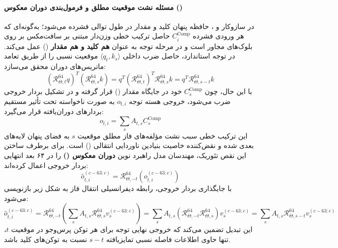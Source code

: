 \paragraph*{مسئله نشت موقعیت مطلق و فرمول‌بندی دوران معکوس ()}
در سازوکار  و ، حافظه پنهان کلید و مقدار در طول توالی فشرده می‌شود؛ به‌گونه‌ای که هر ورودی فشرده $C_i^{\text{Comp}}$ حاصل ترکیب خطی وزن‌دار مبتنی بر سافت‌مکس بر روی بلوک‌های مجاور است و در مرحله توجه به عنوان \textbf{هم کلید و هم مقدار} () عمل می‌کند. در توجه استاندارد، حاصل ضرب داخلی $\langle q_t, k_s \rangle$ موقعیت نسبی را از طریق تعامد ماتریس‌های دوران محقق می‌سازد:
\begin{equation}
    (\mathcal{R}_{\Theta, t}^{64} q)^T (\mathcal{R}_{\Theta, s}^{64} k) = q^T (\mathcal{R}_{\Theta, t}^{64})^T \mathcal{R}_{\Theta, s}^{64} k = q^T \mathcal{R}_{\Theta, s-t}^{64} k
\end{equation}
با این حال، چون $C_s^{\text{Comp}}$ خود در جایگاه مقدار () قرار گرفته و در تشکیل بردار خروجی ضرب می‌شود، خروجی هسته توجه $o_{t, i}$ به صورت ناخواسته تحت تأثیر مستقیم بردارهای دوران‌یافته قرار می‌گیرد:
\begin{equation}
    o_{t, i} = \sum_{s} A_{t, s} C_s^{\text{Comp}}
\end{equation}
این ترکیب خطی سبب نشت مؤلفه‌های فاز مطلق موقعیت $s$ به فضای پنهان لایه‌های بعدی شده و نقض‌کننده خاصیت بنیادین ناوردایی انتقالی () است. برای برطرف ساختن این نقص تئوریک، مهندسان مدل راهبرد نوین \textbf{دوران معکوس ()} را در ۶۴ بعد انتهایی بردار خروجی اعمال کرده‌اند:
\begin{equation}
    \hat{o}_{t, i}^{(c-63:c)} = \mathcal{R}_{\Theta, -t}^{64} \left( o_{t, i}^{(c-63:c)} \right)
\end{equation}
با جایگذاری بردار خروجی، رابطه دیفرانسیلی انتقال فاز به شکل زیر بازنویسی می‌شود:
\begin{equation}
    \hat{o}_{t, i}^{(c-63:c)} = \mathcal{R}_{\Theta, -t}^{64} \left( \sum_s A_{t, s} \mathcal{R}_{\Theta, s}^{64} v_s^{(c-63:c)} \right) = \sum_s A_{t, s} \left( \mathcal{R}_{\Theta, -t}^{64} \mathcal{R}_{\Theta, s}^{64} \right) v_s^{(c-63:c)} = \sum_s A_{t, s} \mathcal{R}_{\Theta, s - t}^{64} v_s^{(c-63:c)}
\end{equation}
این تبدیل تضمین می‌کند که خروجی نهایی توجه برای هر توکن پرس‌وجو در موقعیت $t$، تنها حاوی اطلاعات فاصله نسبی تمایزیافته $s - t$ نسبت به توکن‌های کلید باشد.

